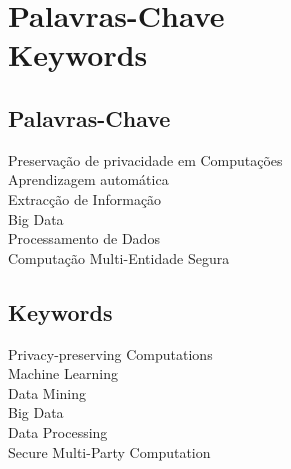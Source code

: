 %

\chapter*{Palavras-Chave \\ Keywords}
\thispagestyle{empty}

\section*{Palavras-Chave} %
{\large

Preserva\c{c}\~{a}o de privacidade em Computa\c{c}\~{o}es      \\
Aprendizagem autom\'{a}tica         \\
Extrac\c{c}\~{a}o de Informa\c{c}\~{a}o \\
Big Data                                \\
Processamento de Dados                  \\
Computa\c{c}\~{a}o Multi-Entidade Segura\\
}

\section*{Keywords} %
{\large
Privacy-preserving Computations\\
Machine Learning               \\
Data Mining					   \\
Big Data 					   \\
Data Processing                \\
Secure Multi-Party Computation \\
}

\vfill

\cleardoublepage
